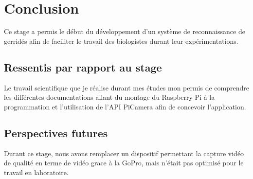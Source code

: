 \chapter{Conclusion}
    Ce stage a permis le début du développement d'un système de reconnaissance de gerridés afin de faciliter le travail des biologistes durant leur expérimentations.
    

    \section{Ressentis par rapport au stage}
    Le travail scientifique que je réalise durant mes études mon permis de comprendre les différentes documentations allant du montage du Raspberry Pi à la programmation et l'utilisation de l'API PiCamera afin de concevoir l'application. 







    \section{Perspectives futures}
    Durant ce stage, nous avons remplacer un dispositif permettant la capture vidéo de qualité en terme de vidéo grace à la GoPro, mais n'était pas optimisé pour le travail en laboratoire.

